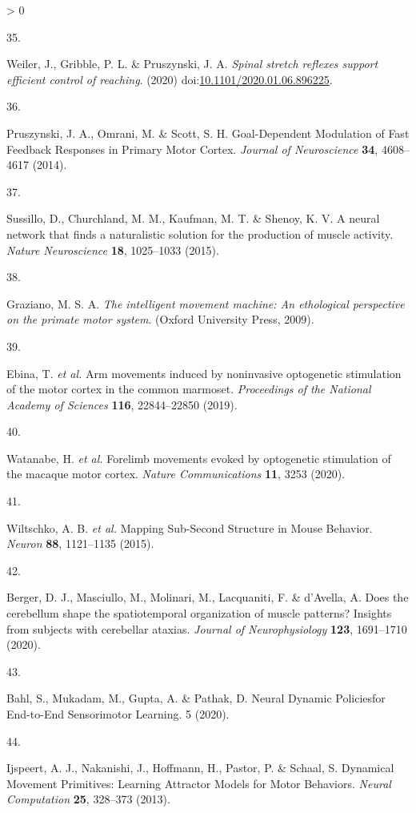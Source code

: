 \documentclass[
  a4paper,
]{article}
\newlength{\cslhangindent}
\newlength{\csllabelwidth}
\newenvironment{CSLReferences}[2] %
 {%
  \setlength{\parindent}{0pt}
  \ifodd #1 \everypar{\setlength{\hangindent}{\cslhangindent}}\ignorespaces\fi
  \ifnum #2 > 0
  \setlength{\parskip}{#2\baselineskip}
  \fi
 }%
 {}
\newcommand{\CSLLeftMargin}[1]{\parbox[t]{\csllabelwidth}{#1}}
\newcommand{\CSLRightInline}[1]{\parbox[t]{\linewidth - \csllabelwidth}{#1}\break}
\begin{document}
\begin{CSLReferences}{0}{0}
\leavevmode\hypertarget{ref-weiler2020}{}%
\CSLLeftMargin{35. }
\CSLRightInline{Weiler, J., Gribble, P. L. \& Pruszynski, J. A.
\emph{Spinal stretch reflexes support efficient control of reaching}.
(2020)
doi:\href{https://doi.org/10.1101/2020.01.06.896225}{10.1101/2020.01.06.896225}.}

\leavevmode\hypertarget{ref-pruszynski2014}{}%
\CSLLeftMargin{36. }
\CSLRightInline{Pruszynski, J. A., Omrani, M. \& Scott, S. H.
Goal-{Dependent Modulation} of {Fast Feedback Responses} in {Primary
Motor Cortex}. \emph{Journal of Neuroscience} \textbf{34}, 4608--4617
(2014).}

\leavevmode\hypertarget{ref-sussillo2015}{}%
\CSLLeftMargin{37. }
\CSLRightInline{Sussillo, D., Churchland, M. M., Kaufman, M. T. \&
Shenoy, K. V. A neural network that finds a naturalistic solution for
the production of muscle activity. \emph{Nature Neuroscience}
\textbf{18}, 1025--1033 (2015).}

\leavevmode\hypertarget{ref-grazianoIntelligentMovementMachine2009}{}%
\CSLLeftMargin{38. }
\CSLRightInline{Graziano, M. S. A. \emph{The intelligent movement
machine: An ethological perspective on the primate motor system}.
({Oxford University Press}, 2009).}

\leavevmode\hypertarget{ref-ebina2019}{}%
\CSLLeftMargin{39. }
\CSLRightInline{Ebina, T. \emph{et al.} Arm movements induced by
noninvasive optogenetic stimulation of the motor cortex in the common
marmoset. \emph{Proceedings of the National Academy of Sciences}
\textbf{116}, 22844--22850 (2019).}

\leavevmode\hypertarget{ref-watanabeForelimbMovementsEvoked2020}{}%
\CSLLeftMargin{40. }
\CSLRightInline{Watanabe, H. \emph{et al.} Forelimb movements evoked by
optogenetic stimulation of the macaque motor cortex. \emph{Nature
Communications} \textbf{11}, 3253 (2020).}

\leavevmode\hypertarget{ref-wiltschkoMappingSubSecondStructure2015}{}%
\CSLLeftMargin{41. }
\CSLRightInline{Wiltschko, A. B. \emph{et al.} Mapping {Sub}-{Second
Structure} in {Mouse Behavior}. \emph{Neuron} \textbf{88}, 1121--1135
(2015).}

\leavevmode\hypertarget{ref-bergerDoesCerebellumShape2020}{}%
\CSLLeftMargin{42. }
\CSLRightInline{Berger, D. J., Masciullo, M., Molinari, M., Lacquaniti,
F. \& d'Avella, A. Does the cerebellum shape the spatiotemporal
organization of muscle patterns? {Insights} from subjects with
cerebellar ataxias. \emph{Journal of Neurophysiology} \textbf{123},
1691--1710 (2020).}

\leavevmode\hypertarget{ref-bahlNeuralDynamicPoliciesfor2020}{}%
\CSLLeftMargin{43. }
\CSLRightInline{Bahl, S., Mukadam, M., Gupta, A. \& Pathak, D. Neural
{Dynamic Policiesfor End}-to-{End Sensorimotor Learning}. 5 (2020).}

\leavevmode\hypertarget{ref-ijspeertDynamicalMovementPrimitives2013}{}%
\CSLLeftMargin{44. }
\CSLRightInline{Ijspeert, A. J., Nakanishi, J., Hoffmann, H., Pastor, P.
\& Schaal, S. Dynamical {Movement Primitives}: {Learning Attractor
Models} for {Motor Behaviors}. \emph{Neural Computation} \textbf{25},
328--373 (2013).}

\end{CSLReferences}
\end{document}
